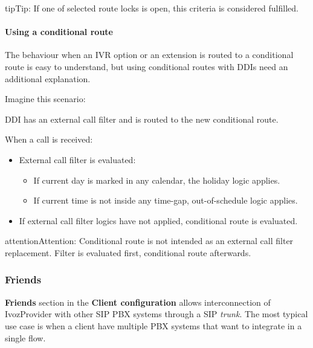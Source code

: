 \documentclass[letterpaper,10pt,english]{sphinxmanual}
\begin{document}
\begin{notice}{tip}{Tip:}
If one of selected route locks is open, this criteria is considered fulfilled.
\end{notice}


\paragraph{Using a conditional route}
\label{administration_portal/client/vpbx/routing_endpoints/conditional_routes:using-a-conditional-route}
The behaviour when an IVR option or an extension is routed to a conditional
route is easy to understand, but using conditional routes with DDIs need an
additional explanation.

Imagine this scenario:

DDI has an external call filter and is routed to the new conditional route.

When a call is received:
\begin{itemize}
\item {} 
External call filter is evaluated:
\begin{itemize}
\item {} 
If current day is marked in any calendar, the holiday logic applies.

\item {} 
If current time is not inside any time-gap, out-of-schedule logic applies.

\end{itemize}

\item {} 
If external call filter logics have not applied, conditional route is evaluated.

\end{itemize}

\begin{notice}{attention}{Attention:}
Conditional route is not intended as an external call filter
replacement. Filter is evaluated first, conditional route afterwards.
\end{notice}


\subsubsection{Friends}
\label{administration_portal/client/vpbx/routing_endpoints/friends/index:friends}\label{administration_portal/client/vpbx/routing_endpoints/friends/index::doc}
\textbf{Friends} section in the \textbf{Client configuration} allows interconnection of
IvozProvider with other SIP PBX systems through a SIP \emph{trunk}. The most typical
use case is when a client have multiple PBX systems that want to integrate in
a single flow.
\end{document}
